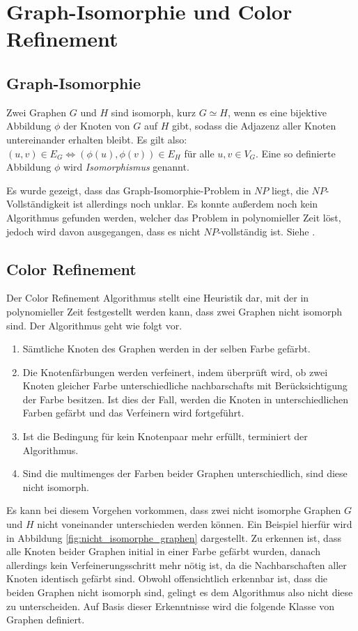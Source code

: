 \section{Graph-Isomorphie und Color Refinement}
\label{sec/gi_cr}

\subsection{Graph-Isomorphie}
Zwei Graphen $G$ und $H$ sind isomorph, kurz $G\simeq H$, wenn es eine bijektive Abbildung $\phi$ der Knoten von $G$ auf $H$ gibt, sodass die Adjazenz aller Knoten untereinander erhalten bleibt.
Es gilt also: $(u,v)\in E_G\Leftrightarrow (\phi (u),\phi (v))\in E_H$ für alle $u,v\in V_G$.
Eine so definierte Abbildung $\phi$ wird \emph{Isomorphismus} genannt.

Es wurde gezeigt, dass das Graph-Isomorphie-Problem in $NP$ liegt, die $NP$-Vollständigkeit ist allerdings noch unklar.
Es konnte außerdem noch kein Algorithmus gefunden werden, welcher das Problem in polynomieller Zeit löst, jedoch wird davon ausgegangen, dass es nicht $NP$-vollständig ist.
Siehe \cite{Goldreich1991}.

\subsection{Color Refinement}
\label{sec/cr}
Der Color Refinement Algorithmus stellt eine Heuristik dar, mit der in polynomieller Zeit festgestellt werden kann, dass zwei Graphen nicht isomorph sind.
Der Algorithmus geht wie folgt vor.\\
\begin{enumerate}
	\item Sämtliche Knoten des Graphen werden in der selben Farbe gefärbt.
	\item Die Knotenfärbungen werden verfeinert, indem überprüft wird, ob zwei Knoten gleicher Farbe unterschiedliche \glspl{nachbarschaft} mit Berücksichtigung der Farbe besitzen.
	Ist dies der Fall, werden die Knoten in unterschiedlichen Farben gefärbt und das Verfeinern wird fortgeführt.
	\item Ist die Bedingung für kein Knotenpaar mehr erfüllt, terminiert der Algorithmus.
	\item Sind die \glspl{multimenge} der Farben beider Graphen unterschiedlich, sind diese nicht isomorph.
\end{enumerate}

Es kann bei diesem Vorgehen vorkommen, dass zwei nicht isomorphe Graphen $G$ und $H$ nicht voneinander unterschieden werden können.
Ein Beispiel hierfür wird in Abbildung \ref{fig:nicht_isomorphe_graphen} dargestellt.
Zu erkennen ist, dass alle Knoten beider Graphen initial in einer Farbe gefärbt wurden, danach allerdings kein Verfeinerungsschritt mehr nötig ist, da die Nachbarschaften aller Knoten identisch gefärbt sind.
Obwohl offensichtlich erkennbar ist, dass die beiden Graphen nicht isomorph sind, gelingt es dem Algorithmus also nicht diese zu unterscheiden.
Auf Basis dieser Erkenntnisse wird die folgende Klasse von Graphen definiert.

